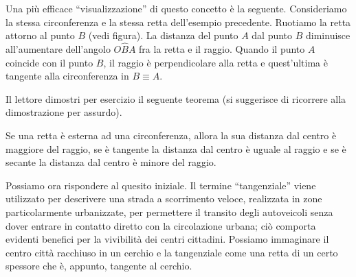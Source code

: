 Una più efficace ``visualizzazione'' di questo concetto è la seguente.
Consideriamo la stessa circonferenza e la stessa retta dell'esempio precedente. Ruotiamo la retta attorno al punto $B$ (vedi figura).
La distanza del punto $A$ dal punto $B$ diminuisce all'aumentare dell'angolo $O\widehat{B}A$ fra la retta e il raggio. Quando il punto $A$ coincide con il punto $B$, il raggio è perpendicolare alla retta e quest'ultima è tangente alla circonferenza in $B\equiv A$.

Il lettore dimostri per esercizio il seguente teorema (si suggerisce di ricorrere alla dimostrazione per assurdo).
\begin{teorema}
Se una retta è esterna ad una circonferenza, allora la sua distanza dal centro è maggiore del raggio, se è tangente la distanza dal centro è uguale al raggio e se è secante la distanza dal centro è minore del raggio.
\end{teorema}

Possiamo ora rispondere al quesito iniziale. Il termine ``tangenziale'' viene utilizzato per descrivere una strada a scorrimento veloce, realizzata in zone particolarmente urbanizzate, per permettere il transito degli autoveicoli senza dover entrare in contatto diretto con la circolazione urbana; ciò comporta evidenti benefici per la vivibilità dei centri cittadini. Possiamo immaginare il centro città racchiuso in un cerchio e la tangenziale come una retta di un certo spessore che è, appunto, tangente al cerchio.


